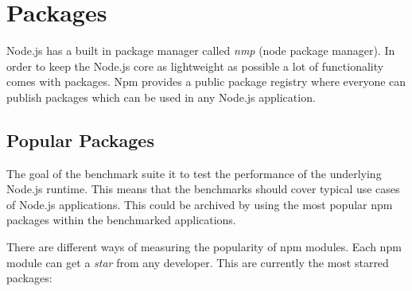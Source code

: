 \section{Packages}
Node.js has a built in package manager called \textit{nmp} (node package manager). In order to keep the Node.js core as lightweight as possible a lot of functionality comes with packages. Npm provides a public package registry where everyone can publish packages which can be used in any Node.js application\cite{npm-about}.

\subsection{Popular Packages}
\label{subsec:popular-packages}
The goal of the benchmark suite it to test the performance of the underlying Node.js runtime. This means that the benchmarks should cover typical use cases of Node.js applications. This could be archived by using the most popular npm packages within the benchmarked applications.

There are different ways of measuring the popularity of npm modules. Each npm module can get a \textit{star} from any developer. This are currently the most starred packages\cite{npm-starred}:

